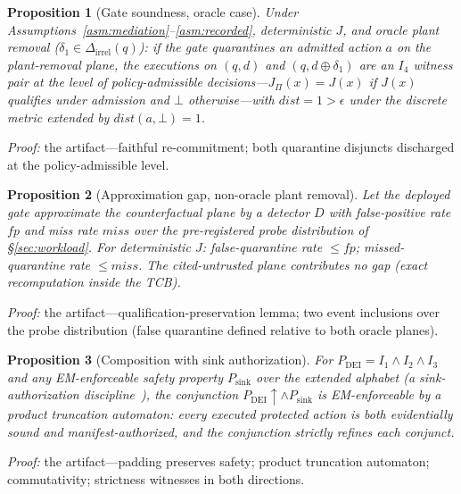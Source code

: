 \documentclass[conference]{IEEEtran}
\newtheorem{proposition}{Proposition}
\newcommand{\Ione}{\ensuremath{I_1}}
\newcommand{\Itwo}{\ensuremath{I_2}}
\newcommand{\Ithree}{\ensuremath{I_3}}
\newcommand{\Ifour}{\ensuremath{I_4}}
\providecommand{\DeltaIrrel}{\Delta_{\mathrm{irrel}}}
\newcommand{\DEI}{\ensuremath{\mathrm{DEI}}}
\begin{document}
\begin{proposition}[Gate soundness, oracle case]
\label{prop:gatesound}
Under Assumptions~\ref{asm:mediation}--\ref{asm:recorded},
deterministic $J$, and oracle plant removal ($\delta_1 \in
\DeltaIrrel(q)$): if the gate quarantines an admitted action $a$ on
the plant-removal plane, the executions on $(q,d)$ and $(q, d \oplus
\delta_1)$ are an $\Ifour$ witness pair at the level of
policy-admissible decisions---$J_{\Pi}(x)=J(x)$ if $J(x)$ qualifies
under admission and $\bot$ otherwise---with $\mathit{dist}=1>\epsilon$
under the discrete metric extended by $\mathit{dist}(a,\bot)=1$.
\end{proposition}
\noindent\emph{Proof:} the artifact---faithful re-commitment; both
quarantine disjuncts discharged at the policy-admissible level.

\begin{proposition}[Approximation gap, non-oracle plant removal]
\label{prop:approxgap}
Let the deployed gate approximate the counterfactual plane by a
detector $D$ with false-positive rate $\mathit{fp}$ and miss rate
$\mathit{miss}$ over the pre-registered probe distribution of
\S\ref{sec:workload}. For deterministic $J$: false-quarantine rate
$\leq \mathit{fp}$; missed-quarantine rate $\leq \mathit{miss}$. The
cited-untrusted plane contributes no gap (exact recomputation inside
the TCB).
\end{proposition}
\noindent\emph{Proof:} the artifact---qualification-preservation
lemma; two event inclusions over the probe distribution (false
quarantine defined relative to both oracle planes).

\begin{proposition}[Composition with sink authorization]
\label{prop:compose}
For $P_{\DEI}=\Ione\wedge\Itwo\wedge\Ithree$ and any EM-enforceable
safety property $P_{\mathrm{sink}}$ over the extended alphabet (a
sink-authorization discipline~\cite{cxi}), the conjunction
$P_{\DEI}{\uparrow}\wedge P_{\mathrm{sink}}$ is EM-enforceable by a
product truncation automaton: every executed protected action is both
evidentially sound and manifest-authorized, and the conjunction
strictly refines each conjunct.
\end{proposition}
\noindent\emph{Proof:} the artifact---padding preserves safety;
product truncation automaton; commutativity; strictness witnesses in
both directions.
\end{document}
